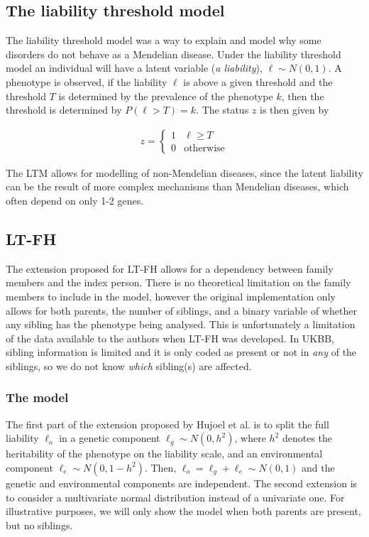 \subsection{The liability threshold model}
The liability threshold model was a way to explain and model why some disorders do not behave as a Mendelian disease. Under the liability threshold model an individual will have a latent variable (\textit{a liability}), $ \ell \sim N(0,1)$. A phenotype is observed, if the liability $ \ell $ is above a given threshold and the threshold $ T $ is determined by the prevalence of the phenotype $ k $, then the threshold is determined by $ P(\ell > T) = k $. The status $ z $ is then given by 

\begin{align*}
z = 
\begin{cases}
1 & \ell \geq T \\
0 & \text{otherwise}
\end{cases}
\end{align*}

The LTM allows for modelling of non-Mendelian diseases, since the latent liability can be the result of more complex mechanisms than Mendelian diseases, which often depend on only 1-2 genes. 


\subsection{LT-FH}
The extension proposed for LT-FH allows for a dependency between family members and the index person. There is no theoretical limitation on the family members to include in the model, however the original implementation only allows for both parents, the number of siblings, and a binary variable of whether any sibling has the phenotype being analysed. This is unfortunately a limitation of the data available to the authors when LT-FH was developed. In UKBB, sibling information is limited and it is only coded as present or not in \textit{any} of the siblings, so we do not know \textit{which} sibling(s) are affected. 

\subsubsection{The model}

The first part of the extension proposed by Hujoel et al. is to split the full liability $ \ell_o $ in a genetic component $ \ell_g \sim N(0,h^2) $, where $ h^2 $ denotes the heritability of the phenotype on the liability scale, and an environmental component $ \ell_e \sim N(0, 1-h^2) $. Then, $ \ell_o = \ell_g + \ell_e \sim N(0,1) $ and the genetic and environmental components are independent. The second extension is to consider a multivariate normal distribution instead of a univariate one. For illustrative purposes, we will only show the model when both parents are present, but no siblings. 

